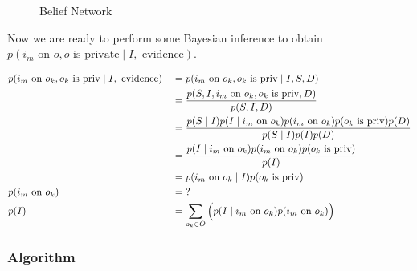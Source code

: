 \documentclass[11pt]{article}
\begin{document}
\begin{figure}[ht]
\centering
    \caption{Belief Network}\label{fig:belief}
\end{figure}

Now we are ready to perform some Bayesian inference to obtain $p(i_m \textrm{ on } o, o \textrm{ is private} \mid I, \textrm{ evidence})$.

\begin{align}
    & p(i_m \textrm{ on } o_k, o_k \textrm{ is priv} \mid I, \textrm{ evidence})     && = p(i_m \textrm{ on } o_k, o_k \textrm{ is priv} \mid I, S, D) \notag\\
    & \quad && = \frac
        {p(S, I, i_m \textrm{ on } o_k, o_k \textrm{ is priv}, D)}
        {p(S, I, D)} \notag\\
    & \quad && = \frac
        {p(S \mid I) p(I \mid i_m \textrm{ on } o_k) p(i_m \textrm{ on } o_k) p(o_k \textrm{ is priv}) p(D)}
        {p(S \mid I) p(I) p(D)} \notag\\
    & \quad && = \frac
        {p(I \mid i_m \textrm{ on } o_k) p(i_m \textrm{ on } o_k) p(o_k \textrm{ is priv})}
        {p(I)} \label{eqn:joint}\\
    & \quad && = p(i_m \textrm{ on } o_k \mid I) p(o_k \textrm{ is priv}) \label{eqn:indep}\\
    & p(i_m \textrm{ on } o_k) 
        && = \textrm{?}\\
    & p(I)
        && = \sum\limits_{o_k \in O} \Big( p(I \mid i_m \textrm{ on } o_k) p(i_m \textrm{ on } o_k) \Big)%
\end{align}%

\subsubsection{Algorithm}
\end{document}
